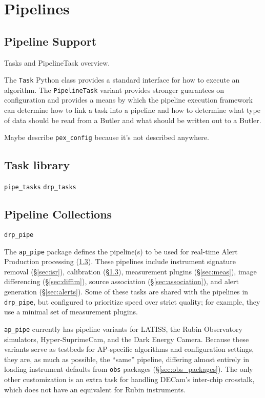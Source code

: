\section{Pipelines}
\label{sec:pipe}

\subsection{Pipeline Support}

Tasks and PipelineTask overview.

The \texttt{Task} Python class provides a standard interface for how to execute an algorithm.
The \texttt{PipelineTask} variant provides stronger guarantees on configuration and provides a means by which the pipeline execution framework can determine how to link a task into a pipeline and how to determine what type of data should be read from a Butler and what should be written out to a Butler.

Maybe describe \texttt{pex\_config} because it's not described anywhere.

\subsection{Task library}

\texttt{pipe\_tasks}
\texttt{drp\_tasks}

\subsection{Pipeline Collections}

\texttt{drp\_pipe}

The \texttt{ap\_pipe} package defines the pipeline(s) to be used for real-time Alert Production processing (\ref{}).
These pipelines include instrument signature removal (\S\ref{sec:isr}), calibration (\S\ref{}), measurement plugins (\S\ref{sec:meas}), image differencing (\S\ref{sec:diffim}), source association (\S\ref{sec:association}), and alert generation (\S\ref{sec:alerts}).
Some of these tasks are shared with the pipelines in \texttt{drp\_pipe}, but configured to prioritize speed over strict quality; for example, they use a minimal set of measurement plugins.

\texttt{ap\_pipe} currently has pipeline variants for LATISS, the Rubin Observatory simulators, Hyper-SuprimeCam, and the Dark Energy Camera.
Because these variants serve as testbeds for AP-specific algorithms and configuration settings, they are, as much as possible, the ``same'' pipeline, differing almost entirely in loading instrument defaults from \texttt{obs} packages (\S\ref{sec:obs_packages}).
The only other customization is an extra task for handling DECam's inter-chip crosstalk, which does not have an equivalent for Rubin instruments.
